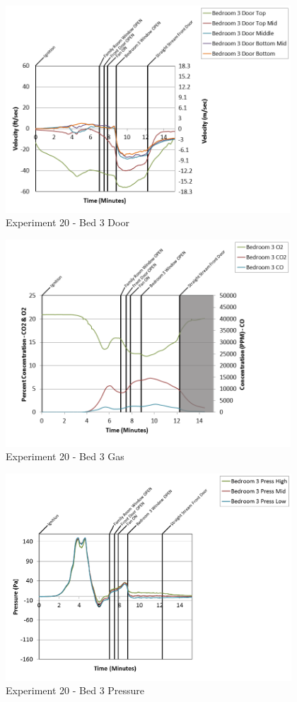 \documentclass{article}
\begin{document}
\begin{appendices}
\begin{figure}[h!]
	\centering
	\includegraphics[height=3.05in]{0_Images/Results_Charts/Exp_20_Charts/Bed3Door.png}
	\caption{Experiment 20 - Bed 3 Door}
\end{figure}

\clearpage

\begin{figure}[h!]
	\centering
	\includegraphics[height=3.05in]{0_Images/Results_Charts/Exp_20_Charts/Bed3Gas.png}
	\caption{Experiment 20 - Bed 3 Gas}
\end{figure}


\begin{figure}[h!]
	\centering
	\includegraphics[height=3.05in]{0_Images/Results_Charts/Exp_20_Charts/Bed3Pressure.png}
	\caption{Experiment 20 - Bed 3 Pressure}
\end{figure}


\end{appendices}
\end{document}
